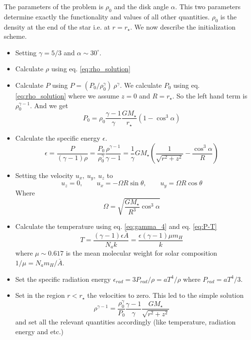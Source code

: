 \documentclass[12pt, a4paper]{article}
\begin{document}
The parameters of the problem is $\rho_0$ and the disk angle $\alpha$. This two parameters determine exactly the functionality and values of all other quantities.
$\rho_0$ is the density at the end of the star i.e. at $r=r_\star$.
We now describe the initialization scheme.
\begin{itemize}
    \item Setting $\gamma=5/3$ and $\alpha\sim 30^\circ$.
    \item Calculate $\rho$ using eq. \ref{eq:rho_solution}
    \item Calculate $P$ using $P=(P_0/\rho_0^\gamma) ~ \rho^\gamma$. We calculate $P_0$ using eq. \ref{eq:rho_solution} where we assume $z=0$ and $R=r_\star$. So the left hand term is $\rho_0^{\gamma-1}$. And we get 
    \begin{equation}
        P_0=\rho_0\frac{\gamma-1}{\gamma}\frac{G M_\star}{r_\star}\left(1-\cos^3\alpha\right)
    \end{equation}
    \item Calculate the specific energy $\epsilon$.
    \begin{equation}
        \epsilon = \frac{P}{(\gamma-1)\rho}=\frac{P_0}{\rho_0^\gamma}\frac{\rho^{\gamma-1}}{\gamma-1} = \frac{1}{\gamma} G M_\star \left( \frac{1}{\sqrt{r^2+z^2}} -\frac{\cos^3\alpha}{R} \right)
    \end{equation}
    \item Setting the velocity $u_x,~u_y,~u_z$ to
    \begin{equation}
        u_z=0, \qquad u_x=-\Omega R \sin \theta, \qquad u_y= \Omega R \cos\theta
    \end{equation}
    Where 
    \begin{equation}
        \Omega=\sqrt{\frac{G M_\star}{R^3}\cos^3\alpha}
    \end{equation}
    \item Calculate the temperature using eq. \ref{eq:gamma_4} and eq. \ref{eq:P-T}
    \begin{equation}
        T=\frac{(\gamma-1)\epsilon \bar{A}}{N_a k} = \frac{\epsilon(\gamma-1)\mu m_H}{k}
    \end{equation}
    where $\mu \sim 0.617$ is the mean molecular weight for solar composition $ 1/\mu = N_a m_H /\bar A $.
    \item Set the specific radiation energy $\epsilon_{rad}=3P_{rad}/\rho=a T^4/\rho$ where $P_{rad}=a T^4/3$.
    \item Set in the region $r<r_\star$ the velocities to zero. This led to the simple solution 
    \begin{equation}
        \rho^{\gamma-1}=\frac{\rho_0^\gamma}{P_0}\frac{\gamma-1}{\gamma} \frac{G M_\star}{\sqrt{r^2+z^2}}
    \end{equation}
    and set all the relevant quantities accordingly (like temperature, radiation energy and etc.)
\end{itemize}
\end{document}
